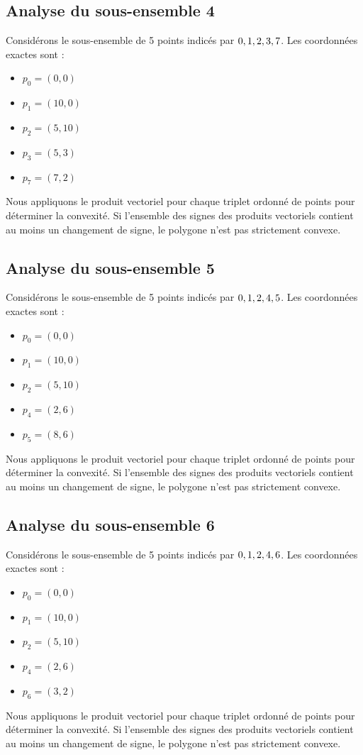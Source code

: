 \documentclass[11pt]{article}
\begin{document}
\subsection{Analyse du sous-ensemble 4}
Considérons le sous-ensemble de 5 points indicés par $\\{ 0, 1, 2, 3, 7 \\}$.
Les coordonnées exactes sont :
\begin{itemize}
\item $p_0 = (0, 0)$
\item $p_1 = (10, 0)$
\item $p_2 = (5, 10)$
\item $p_3 = (5, 3)$
\item $p_7 = (7, 2)$
\end{itemize}
Nous appliquons le produit vectoriel pour chaque triplet ordonné de points pour déterminer la convexité. Si l'ensemble des signes des produits vectoriels contient au moins un changement de signe, le polygone n'est pas strictement convexe.
\newpage

\subsection{Analyse du sous-ensemble 5}
Considérons le sous-ensemble de 5 points indicés par $\\{ 0, 1, 2, 4, 5 \\}$.
Les coordonnées exactes sont :
\begin{itemize}
\item $p_0 = (0, 0)$
\item $p_1 = (10, 0)$
\item $p_2 = (5, 10)$
\item $p_4 = (2, 6)$
\item $p_5 = (8, 6)$
\end{itemize}
Nous appliquons le produit vectoriel pour chaque triplet ordonné de points pour déterminer la convexité. Si l'ensemble des signes des produits vectoriels contient au moins un changement de signe, le polygone n'est pas strictement convexe.
\newpage

\subsection{Analyse du sous-ensemble 6}
Considérons le sous-ensemble de 5 points indicés par $\\{ 0, 1, 2, 4, 6 \\}$.
Les coordonnées exactes sont :
\begin{itemize}
\item $p_0 = (0, 0)$
\item $p_1 = (10, 0)$
\item $p_2 = (5, 10)$
\item $p_4 = (2, 6)$
\item $p_6 = (3, 2)$
\end{itemize}
Nous appliquons le produit vectoriel pour chaque triplet ordonné de points pour déterminer la convexité. Si l'ensemble des signes des produits vectoriels contient au moins un changement de signe, le polygone n'est pas strictement convexe.
\newpage
\end{document}
